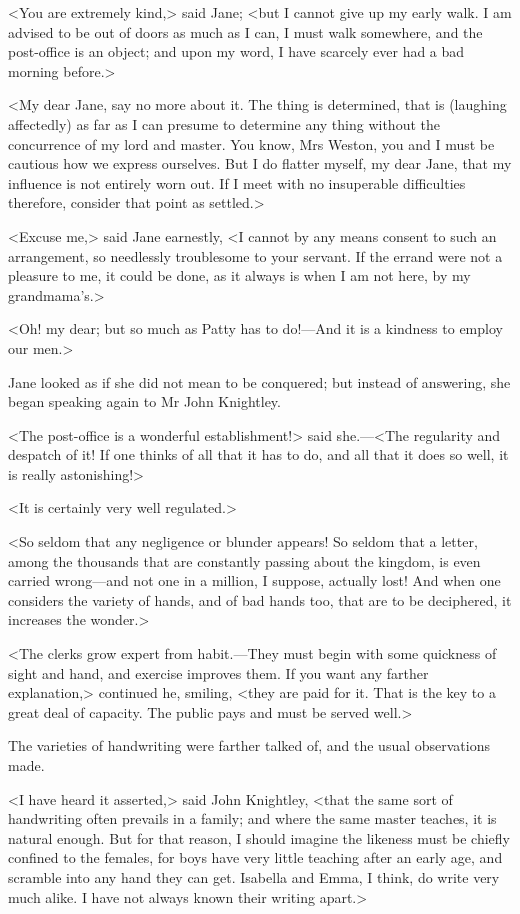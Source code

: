 <You are extremely kind,> said Jane; <but I cannot give up my early walk. I am advised to be out of doors as much as I can, I must walk somewhere, and the post-office is an object; and upon my word, I have scarcely ever had a bad morning before.>

<My dear Jane, say no more about it. The thing is determined, that is (laughing affectedly) as far as I can presume to determine any thing without the concurrence of my lord and master. You know, Mrs Weston, you and I must be cautious how we express ourselves. But I do flatter myself, my dear Jane, that my influence is not entirely worn out. If I meet with no insuperable difficulties therefore, consider that point as settled.>

<Excuse me,> said Jane earnestly, <I cannot by any means consent to such an arrangement, so needlessly troublesome to your servant. If the errand were not a pleasure to me, it could be done, as it always is when I am not here, by my grandmama's.>

<Oh! my dear; but so much as Patty has to do!—And it is a kindness to employ our men.>

Jane looked as if she did not mean to be conquered; but instead of answering, she began speaking again to Mr John Knightley.

<The post-office is a wonderful establishment!> said she.—<The regularity and despatch of it! If one thinks of all that it has to do, and all that it does so well, it is really astonishing!>

<It is certainly very well regulated.>

<So seldom that any negligence or blunder appears! So seldom that a letter, among the thousands that are constantly passing about the kingdom, is even carried wrong—and not one in a million, I suppose, actually lost! And when one considers the variety of hands, and of bad hands too, that are to be deciphered, it increases the wonder.>

<The clerks grow expert from habit.—They must begin with some quickness of sight and hand, and exercise improves them. If you want any farther explanation,> continued he, smiling, <they are paid for it. That is the key to a great deal of capacity. The public pays and must be served well.>

The varieties of handwriting were farther talked of, and the usual observations made.

<I have heard it asserted,> said John Knightley, <that the same sort of handwriting often prevails in a family; and where the same master teaches, it is natural enough. But for that reason, I should imagine the likeness must be chiefly confined to the females, for boys have very little teaching after an early age, and scramble into any hand they can get. Isabella and Emma, I think, do write very much alike. I have not always known their writing apart.>

